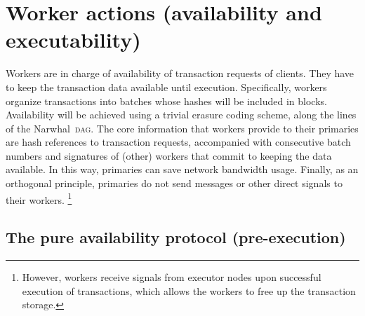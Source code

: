 \documentclass[%
dvipsnames
]{article}
\theoremstyle{definition}
\newcommand{\Dag}[1][]{\textsc{dag}#1\xspace}
\newcommand{\etc}[1][ ]{\emph{etc.}\xspace}
\let\oldendnote\endnote
\renewcommand{\endnote}[2][ ]{%
  \ifthenelse{\equal{#1}{ }}%
  {\marginnote{\oldendnote{#2}}}%
  {\marginnote{\oldendnote[#1]{#2}}}%
}
\renewcommand{\todo}[2][]{}
\renewcommand{\endnote}[2][]{}
\newcounter{old\v,\r}\setcounter{old\v,\r}{0}%
\begin{document}
\section{Worker actions (availability and executability)}
\label{sec:worker-actions}

Workers are in charge of availability of transaction requests of clients. %
They have to keep the transaction data available until execution. %
Specifically, %
workers organize transactions into batches %
whose hashes will be included in blocks. %
Availability will be achieved using a trivial erasure coding scheme, %
along the lines of the Narwhal \Dag \cite{NT}. %
The core information that workers provide to their primaries  %
are hash references to transaction requests, 
accompanied with consecutive batch numbers and %
signatures of (other) workers that commit to keeping the data available. %
In this way,
primaries can save network bandwidth usage. %
Finally, %
as an orthogonal principle, %
primaries do not send messages %
or other direct signals to their workers.\xspace%
\footnote{%
  However, %
  workers receive signals from executor nodes upon successful execution of transactions,  %
  which allows the workers to free up the transaction storage. %
}%
\todo{add some short discussion about executor nodes, \etc \\
  also: is executor node still the right terminology ? 
}
\endnote{%
  Sharing the round number is the point where
  one might be tempted to deviate from the principle that
  validators never talk back to their workers
  (\emph{qua validator} -- the executor nodes on a validator do talk back).
}

\subsection{The pure availability protocol (pre-execution)}
\label{sec:base-protocol}
\endnote{%
  we now “announce” headers
  ---
  in contrast to what what is/was in the specs
  \tiny\tt(written March 7 2023, Tobias Heindel)
}
\end{document}
